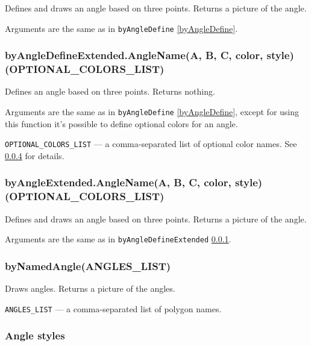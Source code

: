 \documentclass{ltxdoc}
\begin{document}
	Defines and draws an angle based on three points. Returns a picture of the angle.
	
	Arguments are the same as in \texttt{byAngleDefine} \ref{byAngleDefine}.

\subsubsection{byAngleDefineExtended.AngleName(A, B, C, color, style)(OPTIONAL\_COLORS\_LIST)}\label{byAngleDefineExtended}

	Defines an angle based on three points. Returns nothing.
	
	Arguments are the same as in \texttt{byAngleDefine} \ref{byAngleDefine}, except for using this function it's possible to define optional colors for an angle.
	
	\texttt{OPTIONAL\_COLORS\_LIST} — a comma-separated list of optional color names. See \ref{AngleStyles} for details.
	
\subsubsection{byAngleExtended.AngleName(A, B, C, color, style)(OPTIONAL\_COLORS\_LIST)}\label{byAngleExtended}

	Defines and draws an angle based on three points. Returns a picture of the angle.
	
	Arguments are the same as in \texttt{byAngleDefineExtended} \ref{byAngleDefineExtended}.

\subsubsection{byNamedAngle(ANGLES\_LIST)}\label{byNamedAngle}
	
	Draws angles. Returns a picture of the angles.
	
	\texttt{ANGLES\_LIST} — a comma-separated list of polygon names.


\subsubsection{Angle styles}\label{AngleStyles}
\end{document}
